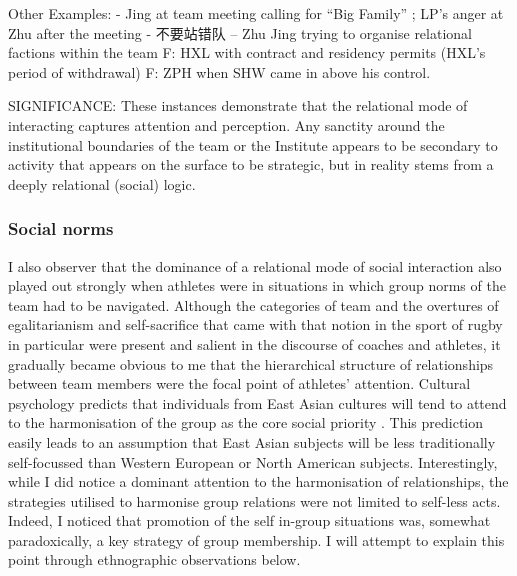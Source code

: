   Other Examples:
  - Jing at team meeting calling for ``Big Family'' ; LP's anger at Zhu after the meeting
  - 不要站错队 -- Zhu Jing trying to organise relational factions within the team
  F: HXL with contract and residency permits (HXL's period of withdrawal)
  F: ZPH when SHW came in above his control.

  SIGNIFICANCE: These instances demonstrate that the relational mode of interacting captures attention and perception. Any sanctity around the institutional boundaries of the team or the Institute appears to be secondary to activity that appears on the surface to be strategic, but in reality stems from a deeply relational (social) logic.







      \subsubsection{Social norms}

  I also observer that the dominance of a relational mode of social interaction also played out strongly when athletes were in situations in which group norms of the team had to be navigated.  Although the categories of team and the overtures of egalitarianism and self-sacrifice that came with that notion in the sport of rugby in particular were present and salient in the discourse of coaches and athletes, it gradually became obvious to me that the hierarchical structure of relationships between team members were the focal point of athletes' attention.  Cultural psychology predicts that individuals from East Asian cultures will tend to attend to the harmonisation of the group as the core social priority \citep{Yuki2003}.  This prediction easily leads to an assumption that East Asian subjects will be less traditionally self-focussed than Western European or North American subjects.  Interestingly, while I did notice a dominant attention to the harmonisation of relationships, the strategies utilised to harmonise group relations were not limited to self-less acts.  Indeed, I noticed that promotion of the self in-group situations was, somewhat paradoxically, a key strategy of group membership.  I will attempt to explain this point through ethnographic observations below.


